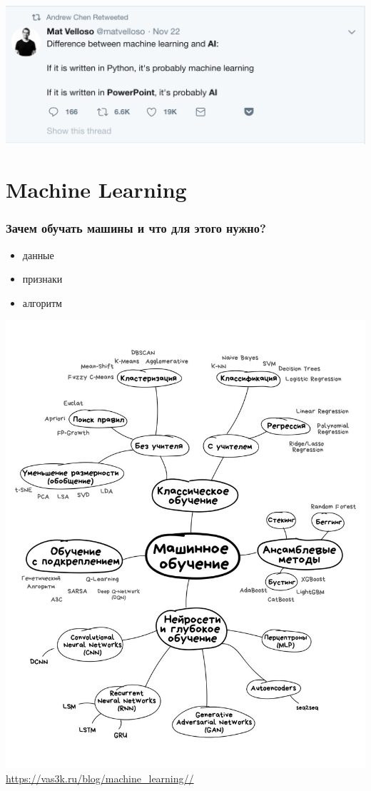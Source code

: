 \documentclass[aspectratio=169,newPxFont]{beamer}
\begin{document}
\begin{frame}{}
\centering \includegraphics[width=1\linewidth]{ai_ml.png}\\
\end{frame}

\section{Machine Learning}

\begin{frame}
\frametitle{Зачем обучать машины и что для этого нужно?}
\begin{itemize}
	\item данные
	\item признаки
	\item алгоритм
\end{itemize}
\end{frame}



\begin{frame}{}
\centering \includegraphics[width=0.45\linewidth]{map.jpg}\\
{\url{https://vas3k.ru/blog/machine_learning//}}
\end{frame}
\end{document}
